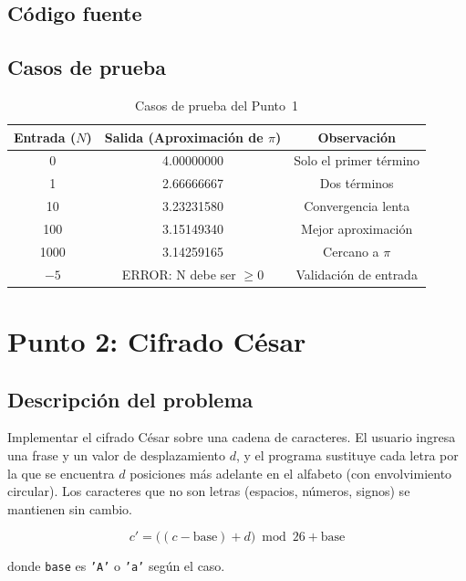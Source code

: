 \documentclass[12pt, letterpaper]{article}
\begin{document}
\subsection{Código fuente}



\subsection{Casos de prueba}

\begin{table}[H]
\centering
\begin{tabular}{|c|c|c|}
\hline
\textbf{Entrada ($N$)} & \textbf{Salida (Aproximación de $\pi$)} & \textbf{Observación} \\
\hline
0   & 4.00000000 & Solo el primer término \\
1   & 2.66666667 & Dos términos \\
10  & 3.23231580 & Convergencia lenta \\
100 & 3.15149340 & Mejor aproximación \\
1000 & 3.14259165 & Cercano a $\pi$ \\
$-5$ & ERROR: N debe ser $\geq 0$ & Validación de entrada \\
\hline
\end{tabular}
\caption{Casos de prueba del Punto~1}
\end{table}

\section{Punto 2: Cifrado César}

\subsection{Descripción del problema}

Implementar el cifrado César sobre una cadena de caracteres. El usuario ingresa
una frase y un valor de desplazamiento $d$, y el programa sustituye cada letra
por la que se encuentra $d$ posiciones más adelante en el alfabeto (con
envolvimiento circular). Los caracteres que no son letras (espacios, números,
signos) se mantienen sin cambio.

\[
    c' = \bigl((c - \text{base}) + d\bigr) \bmod 26 + \text{base}
\]

donde \texttt{base} es \texttt{'A'} o \texttt{'a'} según el caso.
\end{document}

